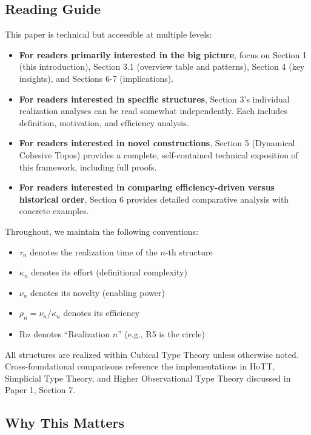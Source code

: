 \documentclass[11pt]{article}
\theoremstyle{definition}
\begin{document}
\subsection{Reading Guide}

This paper is technical but accessible at multiple levels:

\begin{itemize}
\item \textbf{For readers primarily interested in the big picture}, focus on Section 1 (this introduction), Section 3.1 (overview table and patterns), Section 4 (key insights), and Sections 6-7 (implications).

\item \textbf{For readers interested in specific structures}, Section 3's individual realization analyses can be read somewhat independently. Each includes definition, motivation, and efficiency analysis.

\item \textbf{For readers interested in novel constructions}, Section 5 (Dynamical Cohesive Topos) provides a complete, self-contained technical exposition of this framework, including full proofs.

\item \textbf{For readers interested in comparing efficiency-driven versus historical order}, Section 6 provides detailed comparative analysis with concrete examples.
\end{itemize}

Throughout, we maintain the following conventions:
\begin{itemize}
\item $\tau_n$ denotes the realization time of the $n$-th structure
\item $\kappa_n$ denotes its effort (definitional complexity)
\item $\nu_n$ denotes its novelty (enabling power)
\item $\rho_n = \nu_n/\kappa_n$ denotes its efficiency
\item R$n$ denotes ``Realization $n$'' (e.g., R5 is the circle)
\end{itemize}

All structures are realized within Cubical Type Theory unless otherwise noted. Cross-foundational comparisons reference the implementations in HoTT, Simplicial Type Theory, and Higher Observational Type Theory discussed in Paper 1, Section 7.

\subsection{Why This Matters}
\end{document}
